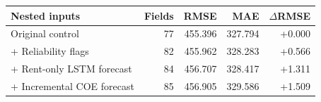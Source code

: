 \begin{tabular}{lrrrr}
\toprule
Nested inputs & Fields & RMSE & MAE & $\Delta$RMSE \\
\midrule
Original control & 77 & 455.396 & 327.794 & +0.000 \\
+ Reliability flags & 82 & 455.962 & 328.283 & +0.566 \\
+ Rent-only LSTM forecast & 84 & 456.707 & 328.417 & +1.311 \\
+ Incremental COE forecast & 85 & 456.905 & 329.586 & +1.509 \\
\bottomrule
\end{tabular}
